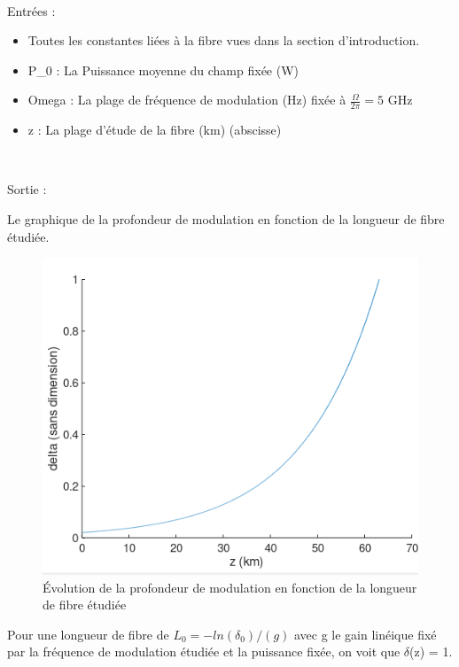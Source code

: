 \documentclass[a4paper,12pt,titlepage]{article}
\begin{document}
             ~
             
             Entrées :
             \begin{itemize}
                 \item Toutes les constantes liées à la fibre vues dans la section d'introduction.
                 \item P\_0 : La Puissance moyenne du champ fixée (W)
                 \item Omega : La plage de fréquence de modulation (Hz) fixée à $\frac{\Omega}{2\pi} = 5 $ GHz
                 \item z : La plage d'étude de la fibre (km) (abscisse)
                 
             \end{itemize}
             
             ~
             
             Sortie :
             
            Le graphique de la profondeur de modulation en fonction de la longueur de fibre étudiée.
    
        \begin{figure}[h!]
            \centering
            \includegraphics{delta(z)}
            \caption{Évolution de la profondeur de modulation en fonction de la longueur de fibre étudiée}
            \label{delta}
        \end{figure}
        
        Pour une longueur de fibre de $L_0 = -ln(\delta_0)/(g)$ avec g le gain linéique fixé par la fréquence de modulation étudiée et la puissance fixée, on voit que $\delta$(z) = 1.
        
\end{document}
